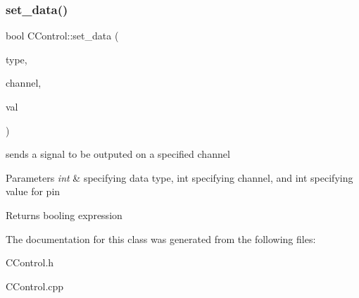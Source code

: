 \subsubsection{\texorpdfstring{set\+\_\+data()}{set\_data()}}
{\footnotesize\ttfamily bool C\+Control\+::set\+\_\+data (\begin{DoxyParamCaption}\item[{int}]{type,  }\item[{int}]{channel,  }\item[{int}]{val }\end{DoxyParamCaption})}



sends a signal to be outputed on a specified channel 


\begin{DoxyParams}{Parameters}
{\em int} & specifying data type, int specifying channel, and int specifying value for pin \\
\hline
\end{DoxyParams}
\begin{DoxyReturn}{Returns}
booling expression 
\end{DoxyReturn}


The documentation for this class was generated from the following files\+:\begin{DoxyCompactItemize}
\item 
C\+Control.\+h\item 
C\+Control.\+cpp\end{DoxyCompactItemize}
